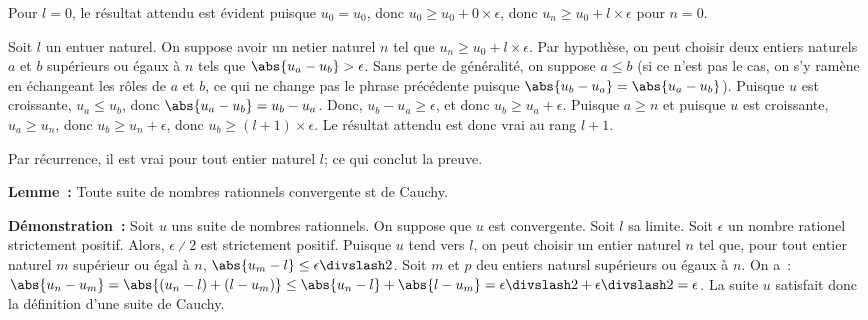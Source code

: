     Pour $l = 0$, le résultat attendu est évident puisque $u_0 = u_0$, donc $u_0 \geq u_0 + 0 \times \epsilon$, donc $u_n \geq u_0 + l \times \epsilon$ pour $n = 0$.

    Soit $l$ un entuer naturel. 
    On suppose avoir un netier naturel $n$ tel que $u_n \geq u_0 + l \times \epsilon$.
    Par hypothèse, on peut choisir deux entiers naturels $a$ et $b$ supérieurs ou égaux à $n$ tels que $\abs{u_a - u_b} > \epsilon$.
    Sans perte de généralité, on suppose $a \leq b$ (si ce n'est pas le cas, on s'y ramène en échangeant les rôles de $a$ et $b$, ce qui ne change pas le phrase précédente puisque $\abs{u_b - u_a} = \abs{u_a - u_b}$).
    Puisque $u$ est croissante, $u_a \leq u_b$, donc $\abs{u_a - u_b} = u_b - u_a$.
    Donc, $u_b - u_a \geq \epsilon$, et donc $u_b \geq u_a + \epsilon$.
    Puisque $a \geq n$ et puisque $u$ est croissante, $u_a \geq u_n$, donc $u_b \geq u_n + \epsilon$, donc $u_b \geq (l+1) \times \epsilon$.
    Le résultat attendu est donc vrai au rang $l+1$. 

    Par récurrence, il est vrai pour tout entier naturel $l$; ce qui conclut la preuve.

    \done

\medskip

\noindent\textbf{Lemme :} Toute suite de nombres rationnels convergente st de Cauchy. 

\medskip

\noindent\textbf{Démonstration :} Soit $u$ uns suite de nombres rationnels.
    On suppose que $u$ est convergente. 
    Soit $l$ sa limite. 
    Soit $\epsilon$ un nombre rationel strictement positif. 
    Alors, $\epsilon \divslash 2$ est strictement positif.
    Puisque $u$ tend vers $l$, on peut choisir un entier naturel $n$ tel que, pour tout entier naturel $m$ supérieur ou égal à $n$, $\abs{u_m - l} \leq \epsilon \divslash 2$. 
    Soit $m$ et $p$ deu entiers natursl supérieurs ou égaux à $n$. 
    On a : $\abs{u_n - u_m} = \abs{(u_n - l) + (l - u_m)} \leq \abs{u_n - l} + \abs{l - u_m} = \epsilon \divslash 2 + \epsilon \divslash 2 = \epsilon$. 
    La suite $u$ satisfait donc la définition d'une suite de Cauchy. 

    \done

\medskip

